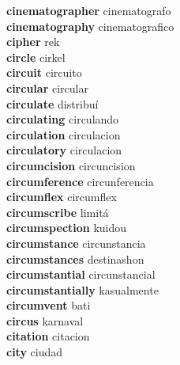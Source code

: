 \textbf{cinematographer } cinematografo \\
\textbf{cinematography } cinematografico \\
\textbf{cipher } rek \\
\textbf{circle } cirkel \\
\textbf{circuit } circuito \\
\textbf{circular } circular \\
\textbf{circulate } distribuí \\
\textbf{circulating } circulando \\
\textbf{circulation } circulacion \\
\textbf{circulatory } circulacion \\
\textbf{circumcision } circuncision \\
\textbf{circumference } circunferencia \\
\textbf{circumflex } circumflex \\
\textbf{circumscribe } limitá \\
\textbf{circumspection } kuidou \\
\textbf{circumstance } circunstancia \\
\textbf{circumstances } destinashon \\
\textbf{circumstantial } circunstancial \\
\textbf{circumstantially } kasualmente \\
\textbf{circumvent } bati \\
\textbf{circus } karnaval \\
\textbf{citation } citacion \\
\textbf{city } ciudad \\
